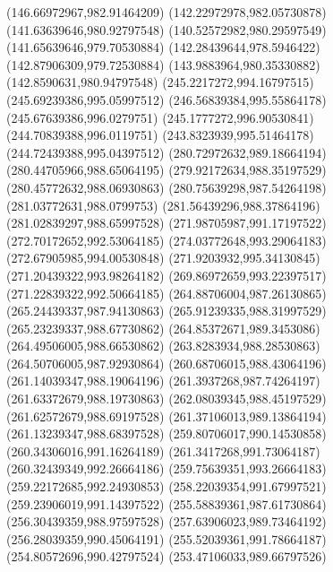 {    \lineto(146.66972967,982.91464209)
    \closepath
    \moveto(142.22972978,982.05730878)
    \lineto(141.63639646,980.92797548)
    \lineto(140.52572982,980.29597549)
    \lineto(141.65639646,979.70530884)
    \lineto(142.28439644,978.5946422)
    \lineto(142.87906309,979.72530884)
    \lineto(143.9883964,980.35330882)
    \lineto(142.8590631,980.94797548)
    \closepath
    \moveto(245.2217272,994.16797515)
    \lineto(245.69239386,995.05997512)
    \lineto(246.56839384,995.55864178)
    \lineto(245.67639386,996.0279751)
    \lineto(245.1777272,996.90530841)
    \lineto(244.70839388,996.0119751)
    \lineto(243.8323939,995.51464178)
    \lineto(244.72439388,995.04397512)
    \closepath
    \moveto(280.72972632,989.18664194)
    \lineto(280.44705966,988.65064195)
    \lineto(279.92172634,988.35197529)
    \lineto(280.45772632,988.06930863)
    \lineto(280.75639298,987.54264198)
    \lineto(281.03772631,988.0799753)
    \lineto(281.56439296,988.37864196)
    \lineto(281.02839297,988.65997528)
    \closepath
    \moveto(271.98705987,991.17197522)
    \lineto(272.70172652,992.53064185)
    \lineto(274.03772648,993.29064183)
    \lineto(272.67905985,994.00530848)
    \lineto(271.9203932,995.34130845)
    \lineto(271.20439322,993.98264182)
    \lineto(269.86972659,993.22397517)
    \lineto(271.22839322,992.50664185)
    \closepath
    \moveto(264.88706004,987.26130865)
    \lineto(265.24439337,987.94130863)
    \lineto(265.91239335,988.31997529)
    \lineto(265.23239337,988.67730862)
    \lineto(264.85372671,989.3453086)
    \lineto(264.49506005,988.66530862)
    \lineto(263.8283934,988.28530863)
    \lineto(264.50706005,987.92930864)
    \closepath
    \moveto(260.68706015,988.43064196)
    \lineto(261.14039347,988.19064196)
    \lineto(261.3937268,987.74264197)
    \lineto(261.63372679,988.19730863)
    \lineto(262.08039345,988.45197529)
    \lineto(261.62572679,988.69197528)
    \lineto(261.37106013,989.13864194)
    \lineto(261.13239347,988.68397528)
    \closepath
    \moveto(259.80706017,990.14530858)
    \lineto(260.34306016,991.16264189)
    \lineto(261.3417268,991.73064187)
    \lineto(260.32439349,992.26664186)
    \lineto(259.75639351,993.26664183)
    \lineto(259.22172685,992.24930853)
    \lineto(258.22039354,991.67997521)
    \lineto(259.23906019,991.14397522)
    \closepath
    \moveto(255.58839361,987.61730864)
    \lineto(256.30439359,988.97597528)
    \lineto(257.63906023,989.73464192)
    \lineto(256.28039359,990.45064191)
    \lineto(255.52039361,991.78664187)
    \lineto(254.80572696,990.42797524)
    \lineto(253.47106033,989.66797526)
}

